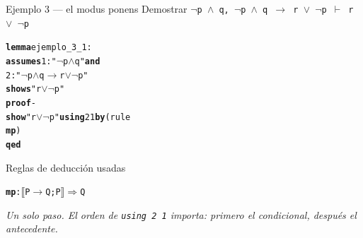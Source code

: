 \documentclass[11pt,aspectratio=169]{beamer}
\newcommand{\sAnd}{\(\wedge\)}
\newcommand{\sOr}{\(\vee\)}
\newcommand{\sNot}{\(\neg\)}
\newcommand{\sImp}{\(\longrightarrow\)}
\newcommand{\sMeta}{\(\Longrightarrow\)}
\newcommand{\sTurn}{\(\vdash\)}
\newcommand{\sLb}{\(\llbracket\)}
\newcommand{\sRb}{\(\rrbracket\)}
\newcommand{\kw}[1]{\textcolor{isaCmd}{\textbf{#1}}}
\newcommand{\str}[1]{\textcolor{isaStr}{#1}}
\newcommand{\Rn}[1]{\textcolor{granate}{\textbf{#1}}}
\newcommand{\R}[1]{{\setlength{\fboxsep}{1pt}%
  \colorbox{resalte}{\ttfamily\bfseries\textcolor{granate}{#1}}}}
\newcommand{\nota}[1]{{\small\itshape\color{gray} #1}}
\begin{document}
\begin{frame}[fragile]{Ejemplo 3 --- el modus ponens}
  Demostrar \quad
  \texttt{\sNot p \sAnd{} q,\; \sNot p \sAnd{} q \sImp{} r \sOr{} \sNot p
  \;\sTurn{}\; r \sOr{} \sNot p}
  \vspace{0.5em}
  
\begin{alltt}\footnotesize
\kw{lemma} ejemplo_3_1:
  \kw{assumes} 1: \str{"\sNot p \sAnd{} q"} \kw{and}
          2: \str{"\sNot p \sAnd{} q \sImp{} r \sOr{} \sNot p"}
  \kw{shows}      \str{"r \sOr{} \sNot p"}
\kw{proof} -
  \kw{show} \str{"r \sOr{} \sNot p"} \kw{using} 2 1 \kw{by} (rule \R{mp})
\kw{qed}
\end{alltt}
  
  \begin{block}{Reglas de deducción usadas}
\begin{alltt}\footnotesize
\Rn{mp}: \sLb{}P \sImp{} Q; P\sRb{} \sMeta{} Q
\end{alltt}
\end{block}
  
  \vspace{0.2em}
  \nota{Un solo paso. El orden de \texttt{using 2 1} importa: primero el
  condicional, después el antecedente.}
\end{frame}
\end{document}
